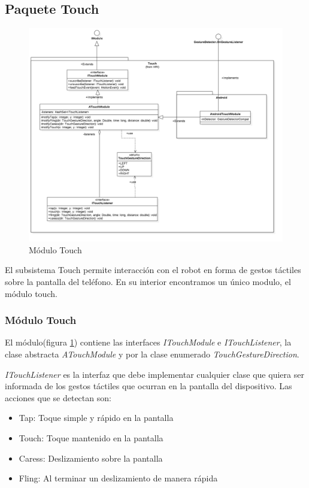 \subsection{Paquete Touch}


\begin{figure}
	\centering
	\includegraphics[width=1\linewidth]{imagenes/diagramas/TouchModule.png}
	\caption{Módulo Touch}
	\label{fig:touch-module}
\end{figure}


El subsistema Touch permite interacción con el robot en forma de gestos táctiles sobre la pantalla del teléfono. En su interior encontramos un único modulo, el módulo touch.
\subsubsection{Módulo Touch}
El módulo(figura \ref{fig:touch-module}) contiene las interfaces \textit{ITouchModule} e \textit{ITouchListener}, la clase abstracta \textit{ATouchModule} y por la clase enumerado \textit{TouchGestureDirection}.

\textit{ITouchListener} es la interfaz que debe implementar cualquier clase que quiera ser informada de los gestos táctiles que ocurran en la pantalla del dispositivo. Las acciones que se detectan son:

\begin{itemize}
	\item  Tap: Toque simple y rápido en la pantalla
	\item  Touch: Toque mantenido en la pantalla
	\item  Caress: Deslizamiento sobre la pantalla
	\item  Fling: Al terminar un deslizamiento de manera rápida
\end{itemize}



